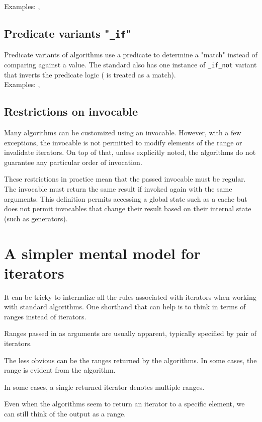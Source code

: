 \noindent Examples: , 

\subsection{Predicate variants "\texttt{\_if}"}

Predicate variants of algorithms use a predicate to determine a "match" instead of comparing against a value. The standard also has one instance of \texttt{\_if\_not} variant that inverts the predicate logic ( is treated as a match).\\

\noindent Examples: , 

\subsection{Restrictions on invocable}

Many algorithms can be customized using an invocable. However, with a few exceptions, the invocable is not permitted to modify elements of the range or invalidate iterators. On top of that, unless explicitly noted, the algorithms do not guarantee any particular order of invocation.

These restrictions in practice mean that the passed invocable must be regular. The invocable must return the same result if invoked again with the same arguments. This definition permits accessing a global state such as a cache but does not permit invocables that change their result based on their internal state (such as generators).

\section{A simpler mental model for iterators}

It can be tricky to internalize all the rules associated with iterators when working with standard algorithms. One shorthand that can help is to think in terms of ranges instead of iterators.

Ranges passed in as arguments are usually apparent, typically specified by pair of iterators.



The less obvious can be the ranges returned by the algorithms. In some cases, the range is evident from the algorithm.

In some cases, a single returned iterator denotes multiple ranges.

Even when the algorithms seem to return an iterator to a specific element, we can still think of the output as a range.